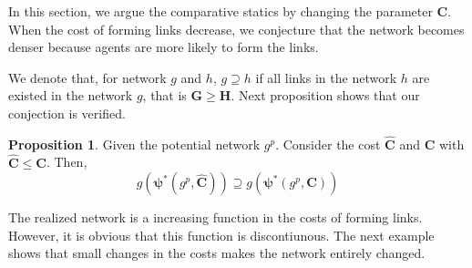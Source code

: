 \documentclass[12pt]{article}
\theoremstyle{definition}
\newtheorem{proposition}{Proposition}
\begin{document}
In this section, we argue the comparative statics by changing the parameter $\bm{C}$.
When the cost of forming links decrease, we conjecture that the network becomes denser because agents are more likely to form the links.

We denote that, for network $g$ and $h$, $g \supseteq h$ if all links in the network $h$ are existed in the network $g$, that is $\bm{G} \ge \bm{H}$.
Next proposition shows that our conjection is verified.

\begin{proposition}
Given the potential network $g^p$.
Consider the cost $\bm{\hat{C}}$ and $\bm{C}$ with $\bm{\hat{C}} \le \bm{C}$.
Then,
\[ g(\bm{\psi}^*(g^p, \bm{\hat{C}})) \supseteq g(\bm{\psi}^*(g^p, \bm{C})) \]
\end{proposition}

The realized network is a increasing function in the costs of forming links.
However, it is obvious that this function is discontiunous.
The next example shows that small changes in the costs makes the network entirely changed.
\end{document}
